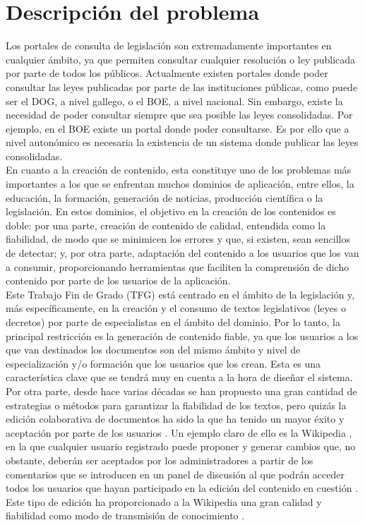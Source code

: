 \section{Descripción del problema}

Los portales de consulta de legislación son extremadamente importantes en cualquier ámbito, ya que permiten consultar cualquier resolución o ley publicada por parte de todos los públicos. Actualmente existen portales donde poder consultar las leyes publicadas por parte de las instituciones públicas, como puede ser el DOG, a nivel gallego, o el BOE, a nivel nacional. Sin embargo, existe la necesidad de poder consultar siempre que sea posible las leyes consolidadas. Por ejemplo, en el BOE existe un portal \cite{boe} donde poder consultarse. Es por ello que a nivel autonómico es necesaria la existencia de un sistema donde publicar las leyes consolidadas.
\\

En cuanto a la creación de contenido, esta constituye uno de los problemas más importantes a los que se enfrentan muchos dominios de aplicación, entre ellos, la educación, la formación, generación de noticias, producción científica o la legislación. En estos dominios, el objetivo en la creación de los contenidos es doble: por una parte, creación de contenido de calidad, entendida como la fiabilidad, de modo que se minimicen los errores y que, si existen, sean sencillos de detectar; y, por otra parte, adaptación del contenido a los usuarios que los van a consumir, proporcionando herramientas que faciliten la comprensión de dicho contenido por parte de los usuarios de la aplicación.
\\

Este Trabajo Fin de Grado (TFG) está centrado en el ámbito de la legislación y, más específicamente, en la creación y el consumo de textos legislativos (leyes o decretos) por parte de especialistas en el ámbito del dominio. Por lo tanto, la principal restricción es la generación de contenido fiable, ya que los usuarios a los que van destinados los documentos son del mismo ámbito y nivel de especialización y/o formación que los usuarios que los crean. Esta es una característica clave que se tendrá muy en cuenta a la hora de diseñar el sistema.
\\

Por otra parte, desde hace varias décadas se han propuesto una gran cantidad de estrategias o métodos para garantizar la fiabilidad de los textos, pero quizás la edición colaborativa de documentos ha sido la que ha tenido un mayor éxito y aceptación por parte de los usuarios \cite{collaborative}. Un ejemplo claro de ello es la Wikipedia \cite{wikipedia}, en la que cualquier usuario registrado puede proponer y generar cambios que, no obstante, deberán ser aceptados por los administradores a partir de los comentarios que se introducen en un panel de discusión al que podrán acceder todos los usuarios que hayan participado en la edición del contenido en cuestión \cite{knowledge}. Este tipo de edición ha proporcionado a la Wikipedia una gran calidad y fiabilidad como modo de transmisión de conocimiento \cite{trustworthiness}.
\\

